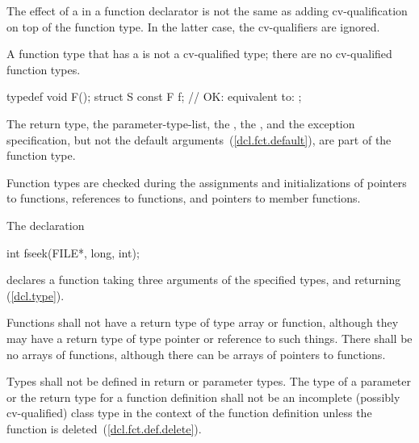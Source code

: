 \pnum
The effect of a
in a function declarator is not the same as
adding cv-qualification on top of the function type.
In the latter case, the cv-qualifiers are ignored.
\begin{note} A function type that has a  is not a
cv-qualified type; there are no cv-qualified function types. \end{note}
\begin{example}

\begin{codeblock}
typedef void F();
struct S {
  const F f;        // OK: equivalent to: 
};
\end{codeblock}
\end{example}

\pnum
The return type, the parameter-type-list, the ,
the , and
the exception specification,
but not the default arguments~(\ref{dcl.fct.default}),
are part of the function type.
\begin{note}
Function types are checked during the assignments and initializations of
pointers to functions, references to functions, and pointers to member functions.
\end{note}

\pnum
\begin{example}
%
The declaration

\begin{codeblock}
int fseek(FILE*, long, int);
\end{codeblock}

declares a function taking three arguments of the specified types,
and returning
(\ref{dcl.type}).
\end{example}

\pnum
{}%
%
Functions shall not have a return type of type array or function,
although they may have a return type of type pointer or reference to such things.
There shall be no arrays of functions, although there can be arrays of pointers
to functions.

\pnum
Types shall not be defined in return or parameter types.
The type of a parameter or the return type for a function
definition shall not be an incomplete
(possibly cv-qualified) class type
in the context of the function definition
unless the function is
deleted~(\ref{dcl.fct.def.delete}).

